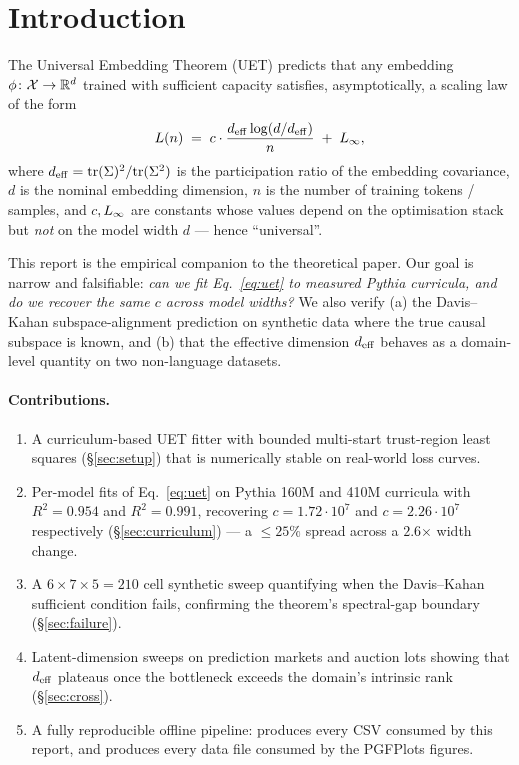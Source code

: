 \section{Introduction}
\label{sec:intro}

The Universal Embedding Theorem (UET) \citep{uet2026} predicts that any
embedding $\phi \colon \mathcal{X} \to \mathbb{R}^d$ trained with sufficient
capacity satisfies, asymptotically, a scaling law of the form
\begin{equation}
\label{eq:uet}
L(n) \;=\; c\cdot \frac{d_{\mathrm{eff}} \log(d/d_{\mathrm{eff}})}{n} \;+\; L_{\infty},
\end{equation}
where $d_{\mathrm{eff}} = \mathrm{tr}(\Sigma)^2 / \mathrm{tr}(\Sigma^2)$ is the participation ratio of
the embedding covariance, $d$ is the nominal embedding dimension, $n$ is the
number of training tokens / samples, and $c, L_{\infty}$ are constants whose
values depend on the optimisation stack but \emph{not} on the model width
$d$ --- hence ``universal''.

This report is the empirical companion to the theoretical paper. Our goal
is narrow and falsifiable: \emph{can we fit Eq.~\eqref{eq:uet} to measured
Pythia curricula, and do we recover the same $c$ across model widths?}
We also verify (a) the Davis--Kahan subspace-alignment prediction on
synthetic data where the true causal subspace is known, and (b) that the
effective dimension $d_{\mathrm{eff}}$ behaves as a domain-level quantity on two
non-language datasets.

\paragraph{Contributions.}
\begin{enumerate}[leftmargin=1.5em,itemsep=1pt]
\item A curriculum-based UET fitter with bounded multi-start trust-region
      least squares (\S\ref{sec:setup}) that is numerically stable on
      real-world loss curves.
\item Per-model fits of Eq.~\eqref{eq:uet} on Pythia 160M and 410M
      curricula with $R^2 = 0.954$ and $R^2 = 0.991$, recovering
      $c = 1.72 \cdot 10^{7}$ and $c = 2.26 \cdot 10^{7}$ respectively
      (\S\ref{sec:curriculum}) --- a $\leq 25\%$ spread across a
      $\mathbf{2.6\boldsymbol{\times}}$ width change.
\item A $6{\times}7{\times}5 = 210$ cell synthetic sweep quantifying when
      the Davis--Kahan sufficient condition fails, confirming the
      theorem's spectral-gap boundary (\S\ref{sec:failure}).
\item Latent-dimension sweeps on prediction markets and auction lots
      showing that $d_{\mathrm{eff}}$ plateaus once the bottleneck exceeds the
      domain's intrinsic rank (\S\ref{sec:cross}).
\item A fully reproducible offline pipeline: 
      produces every CSV consumed by this report, and
       produces every data file consumed
      by the PGFPlots figures.
\end{enumerate}

